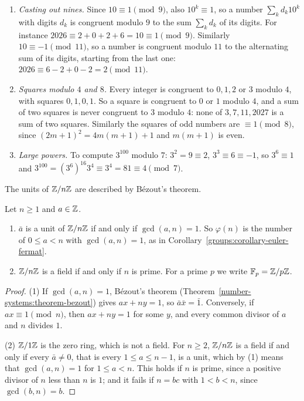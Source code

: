 \begin{example}\label{number-theory:example-congruences}
\begin{enumerate}
\item \emph{Casting out nines.} Since $10 \equiv 1 \pmod 9$, also $10^k \equiv 1$, so a number $\sum_kd_k10^k$ with digits $d_k$ is congruent modulo $9$ to the sum $\sum_kd_k$ of its digits. For instance
$2026 \equiv 2 + 0 + 2 + 6 = 10 \equiv 1 \pmod 9$. Similarly $10 \equiv -1 \pmod{11}$, so a number is congruent modulo $11$ to the alternating sum of its digits, starting from the last one:
$2026 \equiv 6 - 2 + 0 - 2 = 2 \pmod{11}$.
\item \emph{Squares modulo $4$ and $8$.} Every integer is congruent to $0, 1, 2$ or $3$ modulo $4$, with squares $0, 1, 0, 1$. So a square is congruent to $0$ or $1$ modulo $4$, and a sum of two squares
is never congruent to $3$ modulo $4$: none of $3, 7, 11, 2027$ is a sum of two squares. Similarly the squares of odd numbers are $\equiv 1 \pmod 8$, since $(2m + 1)^2 = 4m(m + 1) + 1$ and $m(m + 1)$ is
even.
\item \emph{Large powers.} To compute $3^{100}$ modulo $7$: $3^2 = 9 \equiv 2$, $3^3 \equiv 6 \equiv -1$, so $3^6 \equiv 1$ and $3^{100} = (3^6)^{16}3^4 \equiv 3^4 = 81 \equiv 4 \pmod 7$.
\end{enumerate}
\end{example}

The units of $\mathbb{Z}/n\mathbb{Z}$ are described by B\'ezout's theorem.

\begin{proposition}\label{number-theory:proposition-units}
Let $n \geq 1$ and $a \in \mathbb{Z}$.
\begin{enumerate}
\item $\bar{a}$ is a unit of $\mathbb{Z}/n\mathbb{Z}$ if and only if $\gcd(a, n) = 1$. So $\varphi(n)$ is the number of $0 \leq a < n$ with $\gcd(a, n) = 1$, as in Corollary~\ref{groups:corollary-euler-fermat}.
\item $\mathbb{Z}/n\mathbb{Z}$ is a field if and only if $n$ is prime. For a prime $p$ we write $\mathbb{F}_p = \mathbb{Z}/p\mathbb{Z}$.
\end{enumerate}
\end{proposition}

\begin{proof}
(1) If $\gcd(a, n) = 1$, B\'ezout's theorem (Theorem~\ref{number-systems:theorem-bezout}) gives $ax + ny = 1$, so $\bar{a}\bar{x} = \bar{1}$. Conversely, if $ax \equiv 1 \pmod n$, then $ax + ny = 1$ for
some $y$, and every common divisor of $a$ and $n$ divides $1$.

(2) $\mathbb{Z}/1\mathbb{Z}$ is the zero ring, which is not a field. For $n \geq 2$, $\mathbb{Z}/n\mathbb{Z}$ is a field if and only if every $\bar{a} \neq 0$, that is every $1 \leq a \leq n - 1$, is a unit, which by (1) means that
$\gcd(a, n) = 1$ for $1 \leq a < n$. This holds if $n$ is prime, since a positive divisor of $n$ less than $n$ is $1$; and it fails if $n = bc$ with $1 < b < n$, since $\gcd(b, n) = b$.
\end{proof}

